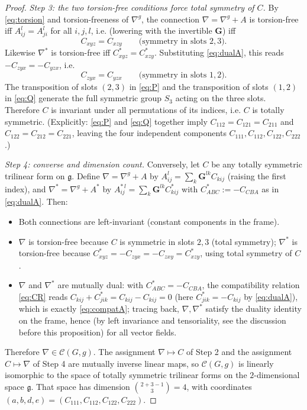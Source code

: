 \documentclass{amsart}
\theoremstyle{definition}
\theoremstyle{remark}
\begin{document}
\begin{proof}
\emph{Step 3: the two torsion-free conditions force total symmetry of $C$.}
By \eqref{eq:torsion} and torsion-freeness of $\nabla^g$, the connection $\nabla=\nabla^g+A$ is torsion-free iff
$A^{l}_{ij}=A^{l}_{ji}$ for all $i,j,l$, i.e. (lowering with the invertible $\mathbf G$) iff
\begin{equation}\label{eq:P}
C_{xyz}=C_{xzy}\qquad\text{(symmetry in slots $2,3$).}
\end{equation}
Likewise $\nabla^{*}$ is torsion-free iff $C^{*}_{xyz}=C^{*}_{xzy}$. Substituting \eqref{eq:dualA}, this reads
$-C_{zyx}=-C_{yzx}$, i.e.
\begin{equation}\label{eq:Q}
C_{zyx}=C_{yzx}\qquad\text{(symmetry in slots $1,2$).}
\end{equation}
The transposition of slots $(2,3)$ in \eqref{eq:P} and the transposition of slots $(1,2)$ in \eqref{eq:Q}
generate the full symmetric group $S_3$ acting on the three slots. Therefore $C$ is invariant under all
permutations of its indices, i.e. $C$ is totally symmetric. (Explicitly: \eqref{eq:P} and \eqref{eq:Q} together
imply $C_{112}=C_{121}=C_{211}$ and $C_{122}=C_{212}=C_{221}$, leaving the four independent components
$C_{111},C_{112},C_{122},C_{222}$.)

\emph{Step 4: converse and dimension count.}
Conversely, let $C$ be any totally symmetric trilinear form on $\mathfrak g$. Define $\nabla=\nabla^g+A$ by
$A^{l}_{ij}=\sum_k\mathbf G^{lk}C_{kij}$ (raising the first index), and $\nabla^{*}=\nabla^g+A^{*}$ by
$A^{*\,l}_{ij}=\sum_k\mathbf G^{lk}C^{*}_{kij}$ with $C^{*}_{ABC}:=-C_{CBA}$ as in \eqref{eq:dualA}. Then:
\begin{itemize}
\item Both connections are left-invariant (constant components in the frame).
\item $\nabla$ is torsion-free because $C$ is symmetric in slots $2,3$ (total symmetry); $\nabla^{*}$ is
torsion-free because $C^{*}_{xyz}=-C_{zyx}=-C_{zxy}=C^{*}_{xzy}$, using total symmetry of $C$.
\item $\nabla$ and $\nabla^{*}$ are mutually dual: with $C^{*}_{ABC}=-C_{CBA}$, the compatibility relation
\eqref{eq:CR} reads $C_{kij}+C^{*}_{jik}=C_{kij}-C_{kij}=0$ (here $C^{*}_{jik}=-C_{kij}$ by \eqref{eq:dualA}),
which is exactly \eqref{eq:compatA}; tracing back, $\nabla,\nabla^{*}$ satisfy the duality identity on the frame,
hence (by left invariance and tensoriality, see the discussion before this proposition) for all vector fields.
\end{itemize}
Therefore $\nabla\in\mathcal C(G,g)$. The assignment $\nabla\mapsto C$ of Step 2 and the assignment
$C\mapsto\nabla$ of Step 4 are mutually inverse linear maps, so $\mathcal C(G,g)$ is linearly isomorphic to the
space of totally symmetric trilinear forms on the $2$-dimensional space $\mathfrak g$. That space has dimension
$\binom{2+3-1}{3}=4$, with coordinates $(a,b,d,e)=(C_{111},C_{112},C_{122},C_{222})$.
\end{proof}
\end{document}

